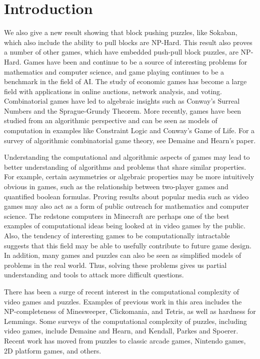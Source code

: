 
\section{Introduction} 
We also give a new result showing that block pushing puzzles, like Sokaban, which also include the ability to pull blocks are NP-Hard. This result also proves a number of other games, which have embedded push-pull block puzzles, are NP-Hard. Games have been and continue to be a source of interesting problems for mathematics and computer science, and game playing continues to be a benchmark in the field of AI. The study of economic games has become a large field with applications in online auctions\cite{auctions}, network analysis\cite{Internet}, and voting\cite{colman2013game}. Combinatorial games have led to algebraic insights such as Conway's Surreal Numbers\cite{Surreal01} and the Sprague-Grundy Theorem\cite{Sprague35, Grundy39}. More recently, games have been studied from an algorithmic perspective and can be seen as models of computation in examples like Constraint Logic \cite{GPCBook09} and Conway's Game of Life\cite{LifeTuring01}. For a survey of algorithmic combinatorial game theory, see Demaine and Hearn's paper\cite{AlgGameTheory_GONC3}.

Understanding the computational and algorithmic aspects of games may lead to better understanding of algorithms and problems that share similar properties. For example, certain asymmetries or algebraic properties may be more intuitively obvious in games, such as the relationship between two-player games and quantified boolean formulas\cite{schaefer1978complexity}. Proving results about popular media such as video games may also act as a form of public outreach for mathematics and computer science. The redstone computers in Minecraft are perhaps one of the best examples of computational ideas being looked at in video games by the public\cite{Minecraft}. Also, the tendency of interesting games to be computationally intractable suggests that this field may be able to usefully contribute to future game design. In addition, many games and puzzles can also be seen as simplified models of problems in the real world. Thus, solving these problems gives us partial understanding and tools to attack more difficult questions.

There has been a surge of recent interest in the computational complexity of video games and puzzles. Examples of previous work in this area includes the NP-completeness of Minesweeper\cite{Minesweeper00}, Clickomania\cite{ClickomaniaGameTheory2000}, and Tetris\cite{Tetris03}, as well as hardness for Lemmings\cite{Lemmings04, viglietta2015lemmings}.    Some surveys of the computational complexity of puzzles, including video games, include Demaine and Hearn\cite{AlgGameTheory_GONC3}, and Kendall, Parkes and Spoerer\cite{NPPuzzles08}. Recent work has moved from puzzles to classic arcade games\cite{HardGames12}, Nintendo games\cite{NintendoFun2014}, 2D platform games\cite{Forisek10}, and others\cite{DBLP:journals/corr/Walsh14, floodIt, DBLP:journals/corr/abs-1203-1633}. 

